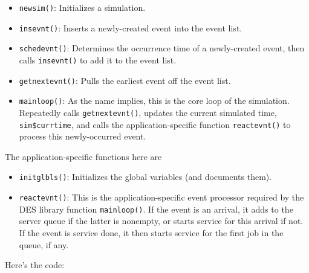 \begin{itemize}

\item {\tt newsim()}:  Initializes a simulation.

\item {\tt insevnt()}:  Inserts a newly-created event into the event
list.

\item {\tt schedevnt()}:  Determines the occurrence time of a
newly-created event, then calls {\tt insevnt()} to add it to the event
list.

\item {\tt getnextevnt()}:  Pulls the earliest event off the event list.

\item {\tt mainloop()}:  As the name implies, this is the core loop of
the simulation.  Repeatedly calls {\tt getnextevnt()}, updates the
current simulated time, {\tt sim\$currtime}, and calls the
application-specific function {\tt reactevnt()} to process this
newly-occurred event.

\end{itemize}

\noindent
The application-specific functions here are 

\begin{itemize}

\item {\tt initglbls()}:  Initializes the global variables (and
documents them).

\item {\tt reactevnt()}:  This is the application-specific event
processor required by the DES library function {\tt mainloop()}.
If the event is an arrival, it adds to the server queue if the latter is
nonempty, or starts service for this arrival if not.  If the event is
service done, it then starts service for the first job in the queue, if
any.

\end{itemize}

Here's the code:

